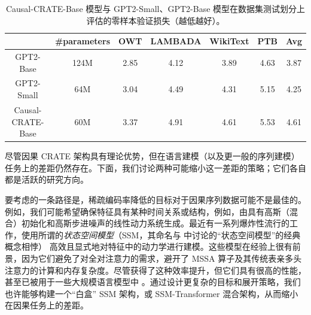 \documentclass[../../book-main_zh.tex]{subfiles}
\begin{document}
\begin{table}[t!]
    \small
    \caption{\small Causal-CRATE-Base 模型与 GPT2-Small、GPT2-Base 模型在数据集测试划分上评估的零样本验证损失（越低越好）。
    }
    \centering
    \resizebox{1\columnwidth}{!}
    {
        \begin{tabular}{ccccccc}
            \hline
            & \#parameters & \textbf{OWT} & \textbf{LAMBADA} &
            \textbf{WikiText} & \textbf{PTB} & \textbf{Avg} \\
            \hline
            GPT2-Base  & {124M} & 2.85 & 4.12 & 3.89 & 4.63 & 3.87 \\
            {GPT2-Small } &  {64M} & {3.04} & {4.49} & {4.31} &
            {5.15} & {4.25} \\
            Causal-CRATE-Base & {60M} & 3.37 & 4.91 & 4.61 & 5.53 & 4.61 \\
            \hline
        \end{tabular}
    }
    \label{tab:causal-crate-results}
\end{table}

尽管因果 CRATE 架构具有理论优势，但在语言建模（以及更一般的序列建模）任务上的差距仍然存在。下面，我们讨论两种可能缩小这一差距的策略；它们各自都是活跃的研究方向。

\begin{example}[更好的目标和展开策略]
    要考虑的一条路径是，稀疏编码率降低的目标对于因果序列数据可能不是最佳的。例如，我们可能希望确保特征具有某种时间关系或结构，例如，由具有高斯（混合）初始化和高斯步进噪声的线性动力系统生成。最近有一系列爆炸性流行的工作，使用所谓的\textit{状态空间模型}（SSM，其命名与  中讨论的“状态空间模型”的经典概念相悖）\citep{gu2024mamba,yang2024parallelizing,yang2024gated} 高效且显式地对特征中的动力学进行建模。这些模型在经验上很有前景，因为它们避免了对全对注意力的需求，避开了 MSSA 算子及其传统表亲多头注意力的计算和内存复杂度。尽管获得了这种效率提升，但它们具有很高的性能，甚至已被用于一些大规模语言模型中 \citep{team2025kimi}。通过设计更复杂的目标和展开策略，我们也许能够构建一个“白盒” SSM 架构，或 SSM-Transformer 混合架构，从而缩小在因果任务上的差距。
\end{example}
\end{document}
